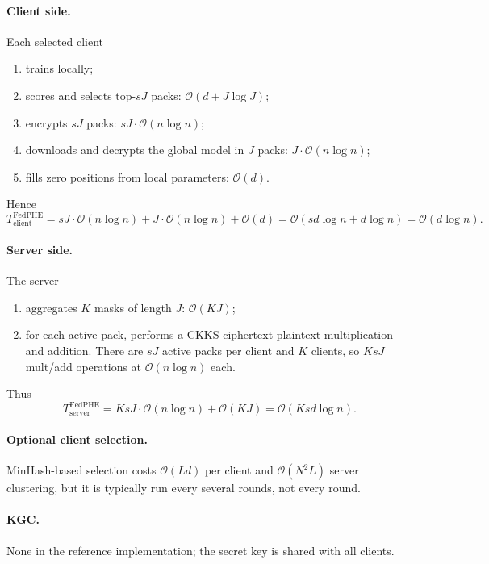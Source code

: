 \documentclass[a4paper,11pt]{article}
\begin{document}
\paragraph{Client side.} Each selected client
\begin{enumerate}
    \item trains locally;
    \item scores and selects top-$sJ$ packs: $\mathcal{O}(d + J\log J)$;
    \item encrypts $sJ$ packs: $sJ\cdot\mathcal{O}(n\log n)$;
    \item downloads and decrypts the global model in $J$ packs: $J\cdot\mathcal{O}(n\log n)$;
    \item fills zero positions from local parameters: $\mathcal{O}(d)$.
\end{enumerate}
Hence
\begin{equation}
\boxed{T_{\text{client}}^{\text{FedPHE}} = sJ\cdot\mathcal{O}(n\log n) + J\cdot\mathcal{O}(n\log n) + \mathcal{O}(d) = \mathcal{O}(sd\log n + d\log n) = \mathcal{O}(d\log n).}
\end{equation}

\paragraph{Server side.} The server
\begin{enumerate}
    \item aggregates $K$ masks of length $J$: $\mathcal{O}(KJ)$;
    \item for each active pack, performs a CKKS ciphertext-plaintext multiplication and addition. There are $sJ$ active packs per client and $K$ clients, so $KsJ$ mult/add operations at $\mathcal{O}(n\log n)$ each.
\end{enumerate}
Thus
\begin{equation}
\boxed{T_{\text{server}}^{\text{FedPHE}} = KsJ\cdot\mathcal{O}(n\log n) + \mathcal{O}(KJ) = \mathcal{O}(Ksd\log n).}
\end{equation}

\paragraph{Optional client selection.} MinHash-based selection costs $\mathcal{O}(Ld)$ per client and $\mathcal{O}(N^2L)$ server clustering, but it is typically run every several rounds, not every round.

\paragraph{KGC.} None in the reference implementation; the secret key is shared with all clients.
\end{document}
